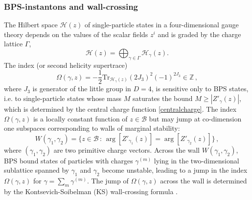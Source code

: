 \documentclass[12pt,reqno]{article}
\numberwithin{equation}{section}
\newcommand{\be}{\begin{equation}}
\newcommand{\ee}{\end{equation}}
\newcommand{\cB}{\mathcal{B}}
\newcommand{\cH}{\mathcal{H}}
\newcommand{\IZ}{\mathbb{Z}}
\numberwithin{equation}{section}
\begin{document}
\subsubsection{BPS-instantons and wall-crossing}

The  Hilbert space $\cH(z)$ of single-particle states in a four-dimensional gauge theory
depends on the values of the scalar fields $z^i$ and is graded by the charge lattice $\Gamma$,
\be
\cH(z)=\bigoplus_{\gamma\in \Gamma}\cH_\gamma(z).
\ee
 The index (or second helicity supertrace)
\be
\Omega(\gamma,z)=-\frac{1}{2}\text{Tr}_{\cH_\gamma(z)}(2J_3)^2 (-1)^{2J_3} \in \IZ\, ,
\label{defindex}
\ee
where $J_3$ is generator of the little group in $D=4$, is sensitive only to
BPS states, i.e. to single-particle states whose mass $M$ saturates the bound
$M\geq |Z'_\gamma(z)|$, which is determined by the central charge function \eqref{centralcharge}.
The index $\Omega(\gamma,z)$ is a locally constant
function of $z\in \cB$ but may jump at co-dimension one subspaces corresponding
to walls of marginal stability:
\be
\label{defwall}
W(\gamma_1,\gamma_2) = \{ z\in \cB \, : \, \arg[Z'_{\gamma_1}(z)]=\arg[Z'_{\gamma_2}(z)]\}\, ,
\ee
 where $(\gamma_1, \gamma_2)$ are two primitive charge vectors. Across the wall
 $W(\gamma_1,\gamma_2)$, BPS bound states of particles with charges $\gamma^{(m)}$
 lying in the two-dimensional sublattice spanned by $\gamma_1$ and $\gamma_2$
 become unstable, leading to a jump in the index $\Omega(\gamma,z)$ for
 $\gamma=\sum_m \gamma^{(m)}$. The jump of $\Omega(\gamma,z)$ across the wall is
 determined by the Kontsevich-Soibelman (KS) wall-crossing formula \cite{ks}.
\end{document}
